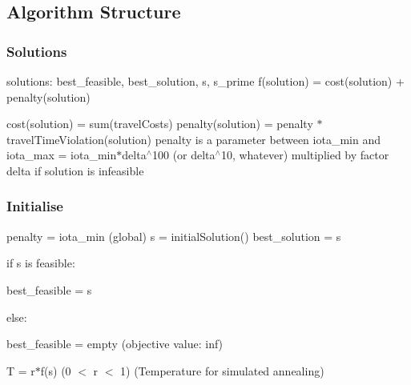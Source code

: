 \subsection*{Algorithm Structure}

\subsubsection*{Solutions}

solutions\+: {\ttfamily best\+\_\+feasible}, {\ttfamily best\+\_\+solution}, {\ttfamily s}, {\ttfamily s\+\_\+prime} f(solution) = cost(solution) + penalty(solution)

cost(solution) = sum(travel\+Costs) penalty(solution) = penalty $\ast$ travel\+Time\+Violation(solution) penalty is a parameter between {\ttfamily iota\+\_\+min} and {\ttfamily iota\+\_\+max = iota\+\_\+min$\ast$delta$^\wedge$100} (or delta$^\wedge$10, whatever) multiplied by factor delta if solution is infeasible

\subsubsection*{Initialise}

{\ttfamily penalty = iota\+\_\+min (global)} {\ttfamily s = initial\+Solution()} {\ttfamily best\+\_\+solution = s}

if {\ttfamily s} is feasible\+:
\begin{DoxyItemize}
\item {\ttfamily best\+\_\+feasible = s}
\end{DoxyItemize}

else\+:
\begin{DoxyItemize}
\item {\ttfamily best\+\_\+feasible} = empty (objective value\+: inf)
\end{DoxyItemize}

{\ttfamily T = r$\ast$f(s) (0 $<$ r $<$ 1)} (Temperature for simulated annealing)

